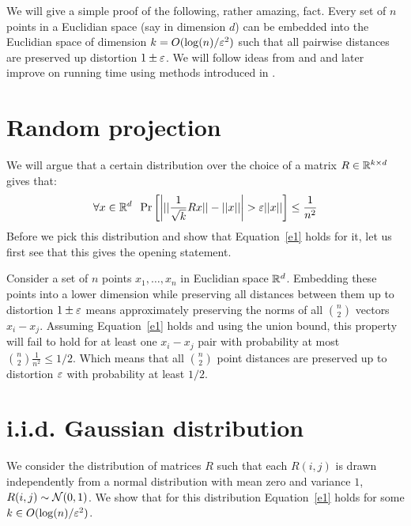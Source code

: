 \documentclass{article}
\begin{document}

We will give a simple proof of the following, rather amazing, fact. Every set of $n$ points 
in a Euclidian space (say in dimension $d$) can be embedded into the Euclidian space of 
dimension $k = O(\log(n)/\varepsilon^2)$ such that all pairwise distances are preserved up distortion $1\pm \varepsilon$.
We will follow ideas from \cite{JL84} and \cite{DasGuptaGupta99} and later improve on running time using 
methods introduced in \cite{AilonCh06}.

\section*{Random projection}
We will argue that a certain distribution over the choice of a matrix $R \in {\mathbb{R}}^{k \times d}$ gives that:
\begin{equation}
\label{e1}
\forall x \in {\mathbb{R}}^{d} \;\; \Pr\left[ \left| ||\frac{1}{\sqrt{k}}Rx|| - ||x|| \right| > \varepsilon||x|| \right] \le \frac{1}{n^2} 
\end{equation}
Before we pick this distribution and show that Equation~\ref{e1} holds for it, let us first see
that this gives the opening statement. 

Consider a set of $n$ points $x_1,\ldots, x_n$ in Euclidian space ${\mathbb{R}}^d$. Embedding these points
into a lower dimension while preserving all distances between
them up to distortion $1\pm \varepsilon$ means approximately preserving the norms of all 
${n \choose 2}$ vectors $x_i - x_j$. Assuming Equation~\ref{e1} holds and using the union 
bound, this property will fail to hold for at least one $x_i - x_j$ pair with probability at most ${n \choose 2}\frac{1}{n^2} \le 1/2$.
Which means that all ${n \choose 2}$ point distances are preserved up to distortion $\varepsilon$ with probability at least $1/2$.


\section{i.i.d. Gaussian distribution}
We consider the distribution of matrices $R$ such that each $R(i,j)$ is drawn independently from  a
normal distribution with mean zero and variance $1$, $R(i,j) \sim {\mathcal{N}}(0,1)$. We show that for this
distribution Equation~\ref{e1} holds for some $k \in O(\log(n)/\varepsilon^2)$.
\end{document}
